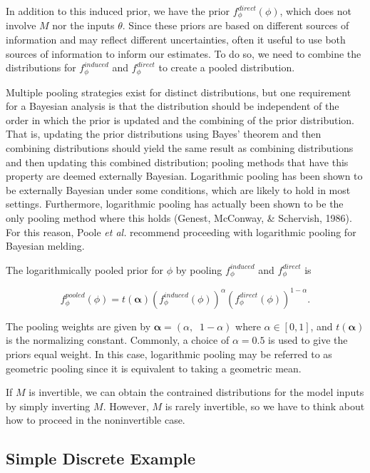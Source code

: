 \documentclass[12pt,twoside]{smiththesis}
\begin{document}
In addition to this induced prior, we have the prior \(f_\phi^{direct}(\phi)\), which does not involve \(M\) nor the inputs \(\theta\). Since these priors are based on different sources of information and may reflect different uncertainties, often it useful to use both sources of information to inform our estimates. To do so, we need to combine the distributions for \(f_\phi^{induced}\) and \(f_\phi^{direct}\) to create a pooled distribution.

Multiple pooling strategies exist for distinct distributions, but one requirement for a Bayesian analysis is that the distribution should be independent of the order in which the prior is updated and the combining of the prior distribution. That is, updating the prior distributions using Bayes' theorem and then combining distributions should yield the same result as combining distributions and then updating this combined distribution; pooling methods that have this property are deemed externally Bayesian. Logarithmic pooling has been shown to be externally Bayesian under some conditions, which are likely to hold in most settings. Furthermore, logarithmic pooling has actually been shown to be the only pooling method where this holds (Genest, McConway, \& Schervish, 1986). For this reason, Poole \emph{et al.} recommend proceeding with logarithmic pooling for Bayesian melding.

The logarithmically pooled prior for \(\phi\) by pooling \(f_\phi^{induced}\) and \(f_\phi^{direct}\) is

\[f_\phi^{pooled} (\phi) = t(\boldsymbol{\alpha}) (f_\phi^{induced}(\phi))^{\alpha} (f_\phi^{direct}(\phi))^{1-\alpha}.\]

The pooling weights are given by \(\boldsymbol{\alpha} = (\alpha, \;\;1-\alpha)\) where \(\alpha \in [0,1]\), and \(t(\boldsymbol{\alpha})\) is the normalizing constant. Commonly, a choice of \(\alpha = 0.5\) is used to give the priors equal weight. In this case, logarithmic pooling may be referred to as geometric pooling since it is equivalent to taking a geometric mean.

If \(M\) is invertible, we can obtain the contrained distributions for the model inputs by simply inverting \(M\). However, \(M\) is rarely invertible, so we have to think about how to proceed in the noninvertible case.

\hypertarget{simple-discrete-example}{%
\subsection{Simple Discrete Example}\label{simple-discrete-example}}
\end{document}
